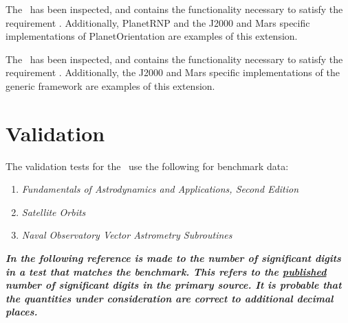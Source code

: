 \label{inspect:orientation_extension}
The \ModelDesc\ has been inspected, and contains the functionality necessary to
satisfy the requirement .
Additionally, PlanetRNP and the J2000 and Mars specific implementations of
PlanetOrientation are examples of this extension.

\label{inspect:extension}
The \ModelDesc\ has been inspected, and contains the functionality necessary to
satisfy the requirement . Additionally, the J2000
and Mars specific implementations of the generic framework are examples of this
extension.

\section{Validation}
The validation tests for the \ModelDesc\ use the following
for benchmark data:
\\      \newline
\begin{enumerate}
\item{\em Fundamentals of Astrodynamics and Applications, Second Edition}
      \cite{VMcC} \label{test:bm1}
\item{\em Satellite Orbits} \cite{MG}\label{test:bm2}
\item{\em Naval Observatory Vector Astrometry Subroutines}
      \cite{NOVAS}\label{test:bm4}
\end{enumerate}
{\em\bf In the following reference is made to the number of significant
digits in a test that matches the benchmark.  This refers to the
\underline{published} number of significant digits in the primary source.
It is probable that the quantities under consideration are correct to
additional decimal places.}

